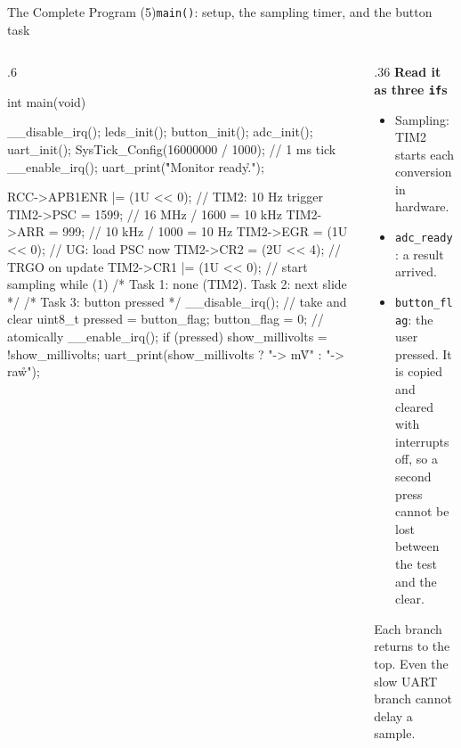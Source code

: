 \documentclass[9pt,aspectratio=169,xcolor=table]{beamer}
\begin{document}
\begin{frame}[fragile]{The Complete Program (5)}{\texttt{main()}: setup, the sampling timer, and the button task}
    \begin{columns}[T]
    \begin{column}{.6\textwidth}
\begin{cc}[basicstyle=\ttfamily\scriptsize]
int main(void) {
    __disable_irq();
    leds_init(); button_init();
    adc_init();  uart_init();
    SysTick_Config(16000000 / 1000);  // 1 ms tick
    __enable_irq();
    uart_print("\r\nSensor Monitor ready.\r\n");

    RCC->APB1ENR |= (1U << 0);   // TIM2: 10 Hz trigger
    TIM2->PSC = 1599;            // 16 MHz / 1600 = 10 kHz
    TIM2->ARR = 999;             // 10 kHz / 1000 = 10 Hz
    TIM2->EGR = (1U << 0);       // UG: load PSC now
    TIM2->CR2 = (2U << 4);       // TRGO on update
    TIM2->CR1 |= (1U << 0);      // start sampling
    while (1) {
        /* Task 1: none (TIM2). Task 2: next slide */
        /* Task 3: button pressed */
        __disable_irq();          // take and clear
        uint8_t pressed = button_flag;
        button_flag = 0;          // atomically
        __enable_irq();
        if (pressed) {
            show_millivolts = !show_millivolts;
            uart_print(show_millivolts ? "-> mV\r\n" : "-> raw\r\n");
        }
    }
}
\end{cc}
    \end{column}
    \begin{column}{.36\textwidth}
        \textbf{Read it as three \texttt{if}s}
        {\small
        \begin{itemize}\itemsep2pt
            \item Sampling: \alert{TIM2} starts each conversion in hardware.
            \item \texttt{adc\_ready}: a result \alert{arrived}.
            \item \texttt{button\_flag}: the user \alert{pressed}. It is copied and cleared with interrupts off, so a second press cannot be lost between the test and the clear.
        \end{itemize}}
        \vspace{1mm}
        {\small Each branch returns to the top. Even the slow UART branch \alert{cannot delay a sample}.}
    \end{column}
    \end{columns}
\end{frame}
\end{document}

